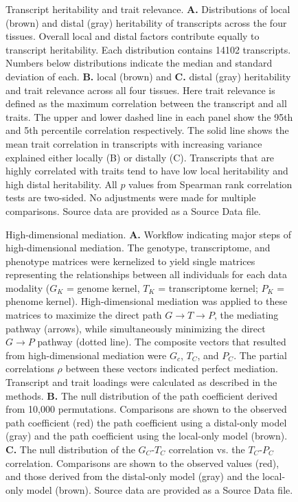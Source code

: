 \documentclass[
]{article}
\begin{document}
\begin{figure}[ht!]
\caption{Transcript heritability and trait relevance. 
\textbf{A.} Distributions of local (brown) and distal (gray) 
heritability of transcripts across the four tissues. Overall 
local and distal factors contribute equally to transcript 
heritability. Each distribution contains 14102 transcripts. 
Numbers below distributions indicate the median and 
standard deviation of each. \textbf{B.} local (brown) and 
\textbf{C.} distal (gray) heritability and trait relevance across 
all four tissues. Here trait relevance is defined as the maximum 
correlation between the transcript and all traits. The upper 
and lower dashed line in each panel show the 95th and 5th 
percentile correlation respectively. The solid line shows the 
mean trait correlation in transcripts with increasing variance 
explained either locally (B) or distally (C). Transcripts that are 
highly correlated with traits tend to have low local heritability 
and high distal heritability. All $p$ values from Spearman rank
correlation tests are two-sided. No adjustments were made 
for multiple comparisons. Source data are provided as a Source 
Data file.
}
\label{fig:motivation}
\end{figure}

\begin{figure}[ht!]
\caption{High-dimensional mediation. \textbf{A.} Workflow 
indicating major steps of high-dimensional mediation. The 
genotype, transcriptome, and phenotype matrices were 
kernelized to yield single matrices representing the 
relationships between all individuals for each data modality 
($G_K$ = genome kernel, $T_K$ = transcriptome kernel; 
$P_K$ = phenome kernel). High-dimensional mediation 
was applied to these matrices to maximize the direct path 
$G \rightarrow T \rightarrow P$, the mediating pathway 
(arrows), while simultaneously minimizing the direct $G 
\rightarrow P$ pathway (dotted line). The composite 
vectors that resulted from high-dimensional mediation 
were $G_c$, $T_C$, and $P_C$. The partial correlations 
$\rho$ between these vectors indicated perfect mediation. 
Transcript and trait loadings were calculated as described 
in the methods. \textbf{B.} The null distribution of the path 
coefficient derived from 10,000 permutations. Comparisons 
are shown to the observed path coefficient (red) the path 
coefficient using a distal-only model (gray) and the path 
coefficient using the local-only model (brown). \textbf{C.} 
The null distribution of the $G_C$-$T_C$ correlation vs. 
the $T_C$-$P_C$ correlation. Comparisons are shown 
to the observed values (red), and those derived from the 
distal-only model (gray) and the local-only model (brown).
Source data are provided as a Source Data file.
}
\label{fig:workflow}
\end{figure}
\end{document}
